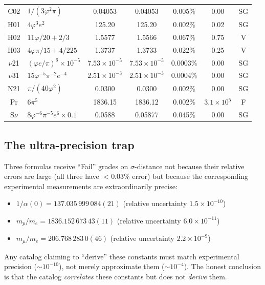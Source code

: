 \documentclass[11pt,a4paper]{article}
\begin{document}
\begin{longtable}{clccccc}
C02 & $1/(3\varphi^{2}\pi)$ & 0.04053 & 0.04053 & 0.005\% & 0.00 & SG \\
H01 & $4\varphi^{3}e^{2}$ & 125.20 & 125.20 & 0.002\% & 0.02 & SG \\
H02 & $11\varphi/20+2/3$ & 1.5577 & 1.5566 & 0.067\% & 0.75 & V \\
H03 & $4\varphi\pi/15+4/225$ & 1.3737 & 1.3733 & 0.022\% & 0.25 & V \\
$\nu$21& $(\varphi e/\pi)^{6}\times10^{-5}$ & $7.53\times10^{-5}$ & $7.53\times10^{-5}$ & 0.0003\% & 0.00 & SG \\
$\nu$31& $15\varphi^{-5}\pi^{-2}e^{-4}$ & $2.51\times10^{-3}$ & $2.51\times10^{-3}$ & 0.0004\% & 0.00 & SG \\
N21 & $\pi/(40\varphi^{2})$ & 0.0300 & 0.0300 & 0.002\% & 0.00 & SG \\
Pr  & $6\pi^{5}$ & 1836.15 & 1836.12 & 0.002\% & $3.1\times10^{5}$ & F \\
S$\nu$& $8\varphi^{-6}\pi^{-5}e^{6}\times0.1$ & 0.0588 & 0.05877 & 0.045\% & 0.00 & SG \\
\end{longtable}

\subsection{The ultra-precision trap}

Three formulas receive ``Fail'' grades on $\sigma$-distance not because
their relative errors are large (all three have $<0.03\%$ error) but
because the corresponding experimental measurements are extraordinarily
precise:
\begin{itemize}
  \item $1/\alpha(0) = 137.035\,999\,084(21)$ (relative uncertainty
    $1.5\times10^{-10}$)
  \item $m_{p}/m_{e} = 1836.152\,673\,43(11)$ (relative uncertainty
    $6.0\times10^{-11}$)
  \item $m_{\mu}/m_{e} = 206.768\,283\,0(46)$ (relative uncertainty
    $2.2\times10^{-9}$)
\end{itemize}
Any catalog claiming to ``derive'' these constants must match
experimental precision ($\sim 10^{-10}$), not merely approximate them
($\sim 10^{-4}$).  The honest conclusion is that the catalog
\emph{correlates} these constants but does not \emph{derive} them.

\end{document}
